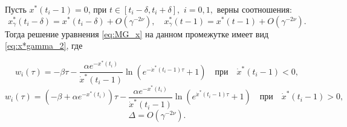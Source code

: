 \begin{lemma}
\label{lm:w}
	Пусть $x^*(t_i - 1) = 0$, при $t \in [t_i - \delta, t_i + \delta],$ $i=0, 1,$ верны соотношения:
	\[ x^*_{\gamma}(t_i - \delta) = x^*(t_i - \delta) + O(\gamma^{-2\nu}), \quad x^*_{\gamma}(t - 1) = x^*(t - 1) + O(\gamma^{-2\nu}).\]
	Тогда решение уравнения \eqref{eq:MG_x} на данном промежутке имеет вид \eqref{eq:x*gamma_2}, где
	
	\[
	w_i(\tau) = -\beta \tau - \dfrac{\alpha e^{-x^*(t_i)}}{\dot{x}^*(t_i - 1)} \ln\left(e^{-\dot{x}^*(t_i - 1)\tau} + 1\right) \quad \text{при} \quad \dot{x}^*(t_i - 1) < 0,
	\]
	\[
	w_i(\tau) = (-\beta + \alpha e^{-x^*(t_i)})\tau - \dfrac{\alpha e^{-x^*(t_i)}}{\dot{x}^*(t_i - 1)} \ln\left(e^{\dot{x}^*(t_i - 1)\tau} + 1\right) \quad \text{при} \quad \dot{x}^*(t_i - 1) > 0,
	\]
	\[
	\Delta = O(\gamma^{-2\nu}).
	\]
\end{lemma}
%
